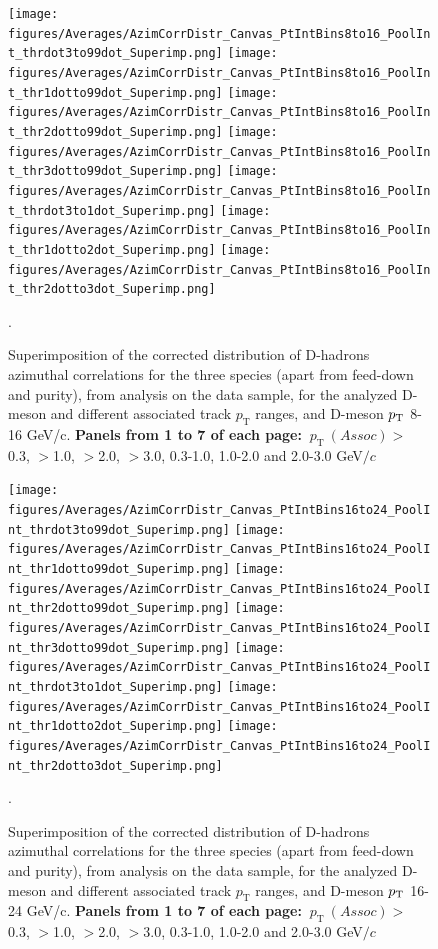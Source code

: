 \newpage
\begin{figure}
\centering
{\texttt{[image: figures/Averages/AzimCorrDistr\_Canvas\_PtIntBins8to16\_PoolInt\_thrdot3to99dot\_Superimp.png]}}
{\texttt{[image: figures/Averages/AzimCorrDistr\_Canvas\_PtIntBins8to16\_PoolInt\_thr1dotto99dot\_Superimp.png]}}
{\texttt{[image: figures/Averages/AzimCorrDistr\_Canvas\_PtIntBins8to16\_PoolInt\_thr2dotto99dot\_Superimp.png]}}
{\texttt{[image: figures/Averages/AzimCorrDistr\_Canvas\_PtIntBins8to16\_PoolInt\_thr3dotto99dot\_Superimp.png]}}
{\texttt{[image: figures/Averages/AzimCorrDistr\_Canvas\_PtIntBins8to16\_PoolInt\_thrdot3to1dot\_Superimp.png]}}
{\texttt{[image: figures/Averages/AzimCorrDistr\_Canvas\_PtIntBins8to16\_PoolInt\_thr1dotto2dot\_Superimp.png]}}
{\texttt{[image: figures/Averages/AzimCorrDistr\_Canvas\_PtIntBins8to16\_PoolInt\_thr2dotto3dot\_Superimp.png]}}
\caption{Superimposition of the corrected distribution of D-hadrons azimuthal correlations for the three species (apart from feed-down and purity), from analysis on the data sample, for the analyzed D-meson and different associated track $p_\text{T}$ ranges, and D-meson $p_{\rm T}$ 8-16 GeV/c. \textbf{Panels from 1 to 7 of each page:} $ \ p_\text{T}~(Assoc)>$ 0.3, $>$1.0, $>$2.0, $>$3.0, 0.3-1.0, 1.0-2.0 and 2.0-3.0 GeV$/c$}.
\label{fig:Data_Res_D0DpDs3}
\end{figure}
\newpage
\begin{figure}
\centering
{\texttt{[image: figures/Averages/AzimCorrDistr\_Canvas\_PtIntBins16to24\_PoolInt\_thrdot3to99dot\_Superimp.png]}}
{\texttt{[image: figures/Averages/AzimCorrDistr\_Canvas\_PtIntBins16to24\_PoolInt\_thr1dotto99dot\_Superimp.png]}}
{\texttt{[image: figures/Averages/AzimCorrDistr\_Canvas\_PtIntBins16to24\_PoolInt\_thr2dotto99dot\_Superimp.png]}}
{\texttt{[image: figures/Averages/AzimCorrDistr\_Canvas\_PtIntBins16to24\_PoolInt\_thr3dotto99dot\_Superimp.png]}}
{\texttt{[image: figures/Averages/AzimCorrDistr\_Canvas\_PtIntBins16to24\_PoolInt\_thrdot3to1dot\_Superimp.png]}}
{\texttt{[image: figures/Averages/AzimCorrDistr\_Canvas\_PtIntBins16to24\_PoolInt\_thr1dotto2dot\_Superimp.png]}}
{\texttt{[image: figures/Averages/AzimCorrDistr\_Canvas\_PtIntBins16to24\_PoolInt\_thr2dotto3dot\_Superimp.png]}}
\caption{Superimposition of the corrected distribution of D-hadrons azimuthal correlations for the three species (apart from feed-down and purity), from analysis on the data sample, for the analyzed D-meson and different associated track $p_\text{T}$ ranges, and D-meson $p_{\rm T}$ 16-24 GeV/c. \textbf{Panels from 1 to 7 of each page:} $ \ p_\text{T}~(Assoc)>$ 0.3, $>$1.0, $>$2.0, $>$3.0, 0.3-1.0, 1.0-2.0 and 2.0-3.0 GeV$/c$}.
\label{fig:Data_Res_D0DpDs4}
\end{figure}

